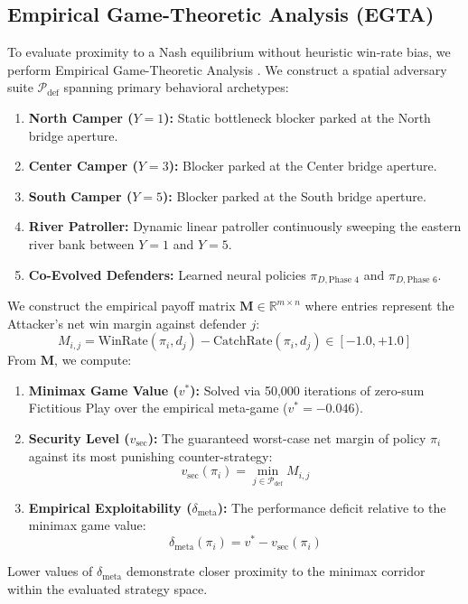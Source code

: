 \documentclass[conference]{IEEEtran}
\begin{document}
\subsection{Empirical Game-Theoretic Analysis (EGTA)}
To evaluate proximity to a Nash equilibrium without heuristic win-rate bias, we perform Empirical Game-Theoretic Analysis \cite{lanctot2017unified}. We construct a spatial adversary suite $\mathcal{P}_{\text{def}}$ spanning primary behavioral archetypes:
\begin{enumerate}
    \item \textbf{North Camper ($Y=1$):} Static bottleneck blocker parked at the North bridge aperture.
    \item \textbf{Center Camper ($Y=3$):} Blocker parked at the Center bridge aperture.
    \item \textbf{South Camper ($Y=5$):} Blocker parked at the South bridge aperture.
    \item \textbf{River Patroller:} Dynamic linear patroller continuously sweeping the eastern river bank between $Y=1$ and $Y=5$.
    \item \textbf{Co-Evolved Defenders:} Learned neural policies $\pi_{D, \text{Phase 4}}$ and $\pi_{D, \text{Phase 6}}$.
\end{enumerate}

We construct the empirical payoff matrix $\bm{M} \in \mathbb{R}^{m \times n}$ where entries represent the Attacker's net win margin against defender $j$:
\begin{equation}
M_{i, j} = \text{WinRate}(\pi_i, d_j) - \text{CatchRate}(\pi_i, d_j) \in [-1.0, +1.0]
\end{equation}
From $\bm{M}$, we compute:
\begin{enumerate}
    \item \textbf{Minimax Game Value ($v^*$):} Solved via 50,000 iterations of zero-sum Fictitious Play over the empirical meta-game ($v^* = -0.046$).
    \item \textbf{Security Level ($v_{\text{sec}}$):} The guaranteed worst-case net margin of policy $\pi_i$ against its most punishing counter-strategy:
    \begin{equation}
    v_{\text{sec}}(\pi_i) = \min_{j \in \mathcal{P}_{\text{def}}} M_{i, j}
    \end{equation}
    \item \textbf{Empirical Exploitability ($\delta_{\text{meta}}$):} The performance deficit relative to the minimax game value:
    \begin{equation}
    \delta_{\text{meta}}(\pi_i) = v^* - v_{\text{sec}}(\pi_i)
    \end{equation}
\end{enumerate}
Lower values of $\delta_{\text{meta}}$ demonstrate closer proximity to the minimax corridor within the evaluated strategy space.
\end{document}
